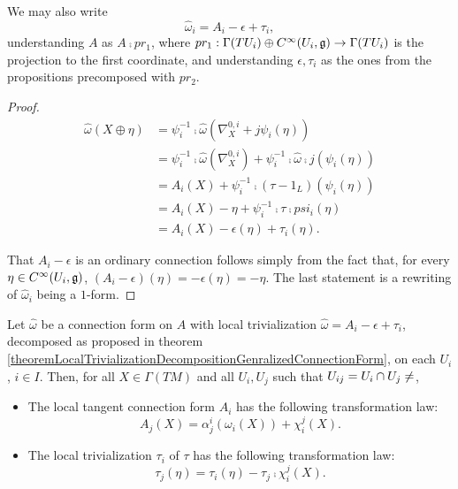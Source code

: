 We may also write 
\begin{equation}
    \hat \omega_i = A_i - \epsilon + \tau_i,
\end{equation}
understanding $A$ as $A \comp pr_1$, where $pr_1: \Gamma(TU_i)\oplus C^\infty(U_i, \mathfrak{g}) \to \Gamma(TU_i)$ is the projection to the first coordinate, and understanding $\epsilon, \tau_i$ as the ones from the propositions precomposed with $pr_2$.

\begin{proof}
\begin{align*}
    \hat \omega(X \oplus \eta) 
        &= \psi_i^{-1} \comp \hat \omega (\nabla^{0, i}_X + j\psi_i(\eta)) \\
        &= \psi_i^{-1} \comp \hat \omega (\nabla^{0, i}_X) + \psi_i^{-1} \comp \hat \omega \comp j (\psi_i(\eta))\\
        &= A_i(X) + \psi_i^{-1} \comp (\tau - 1_L) (\psi_i(\eta))\\
        &= A_i(X) - \eta + \psi_i^{-1} \comp \tau \comp psi_i(\eta) \\
        &= A_i(X) - \epsilon(\eta) + \tau_i(\eta).
\end{align*}

That $A_i - \epsilon$ is an ordinary connection follows simply from the fact that, for every $\eta \in C^\infty(U_i, \mathfrak{g})$, $(A_i - \epsilon)(\eta) = - \epsilon(\eta) = -\eta$. The last statement is a rewriting of $\hat \omega_i$ being a $1$-form.
\end{proof}

\begin{proposition}
Let $\hat \omega$ be a connection form on $A$ with local trivialization $\hat \omega = A_i - \epsilon + \tau_i$, decomposed as proposed in theorem \ref{theoremLocalTrivializationDecompositionGenralizedConnectionForm}, on each $U_i$, $i \in I$. Then, for all $X \in \Gamma(TM)$ and all $U_i, U_j$ such that $U_{ij} = U_i \inter U_j \neq \empty$,

    \begin{itemize}
    
    \item The local tangent connection form $A_i$ has the following transformation law:
        \begin{equation}
                A_j(X) = \alpha^i_j(\omega_i(X)) + \chi^j_i(X).
        \end{equation}
    
    \item The local trivialization $\tau_i$ of $\tau$ has the following transformation law:
        \begin{equation}
                \tau_j(\eta) = \tau_i(\eta) - \tau_j \comp \chi^j_i(X).
        \end{equation}\todo{}
    
    \end{itemize}
\end{proposition}

